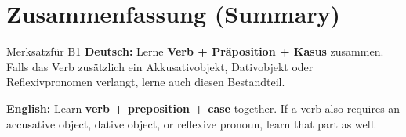 \documentclass[a4paper,11pt]{article}
\newcommand{\GermanText}[1]{\textbf{Deutsch: }#1\par}
\newcommand{\EnglishText}[1]{{\small\color{SoftGray}\textbf{English: }#1\par}}
\begin{document}
\section{Zusammenfassung (Summary)}
\begin{grammarentry}{Merksatz}{für B1}
\GermanText{Lerne \textbf{Verb + Präposition + Kasus} zusammen. Falls das Verb zusätzlich ein Akkusativobjekt, Dativobjekt oder Reflexivpronomen verlangt, lerne auch diesen Bestandteil.}
\EnglishText{Learn \textbf{verb + preposition + case} together. If a verb also requires an accusative object, dative object, or reflexive pronoun, learn that part as well.}
\end{grammarentry}
\end{document}
